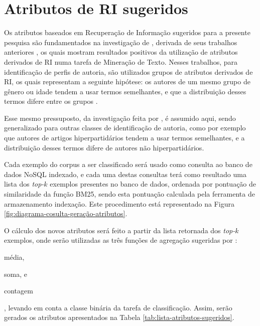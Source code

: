 \section{Atributos de RI sugeridos}  \label{sec:Atributos-de-RI-sugeridos}
    Os atributos baseados em Recuperação de Informação sugeridos para a presente pesquisa são fundamentados na investigação de , derivada de seus trabalhos anteriores \cite{WEREN_CLEF_2014,WEREN_ARTIGO_2014}, os quais mostram resultados positivos da utilização de atributos derivados de RI numa tarefa de Mineração de Texto.
    Nesses trabalhos, para identificação de perfis de autoria, são utilizados grupos de atributos derivados de RI, os quais representam a seguinte hipótese: os autores de um mesmo grupo de gênero ou idade tendem a usar termos semelhantes, e que a distribuição desses termos difere entre os grupos \cite[p.~20]{WEREN_MESTRADO_2014}.
    
    Esse mesmo pressuposto, da investigação feita por , é assumido aqui, sendo generalizado para outras classes de identificação de autoria, como por exemplo que autores de artigos hiperpartidários tendem a usar termos semelhantes, e a distribuição desses termos difere de autores não hiperpartidários.
    
    
    
    Cada exemplo do corpus a ser classificado será usado como consulta ao banco de dados NoSQL indexado, e cada uma destas consultas terá como resultado uma lista dos \textit{top-$k$} exemplos presentes no banco de dados, ordenada por pontuação de similaridade da função BM25, sendo esta pontuação calculada pela ferramenta de armazenamento indexação. Este procedimento está representado na Figura \ref{fig:diagrama-cosulta-geração-atributos}.
    
    O cálculo dos novos atributos será feito a partir da lista retornada dos \textit{top-$k$} exemplos, onde serão utilizadas as três funções de agregação sugeridas por :
    \begin{enumerate*}[label=(\alph*)]
        \item média,
        \item soma, e
        \item contagem
    \end{enumerate*}, 
    levando em conta a classe binária da tarefa de classificação. 
    Assim, serão gerados os atributos apresentados na Tabela \ref{tab:lista-atributos-sugeridos}.
    
